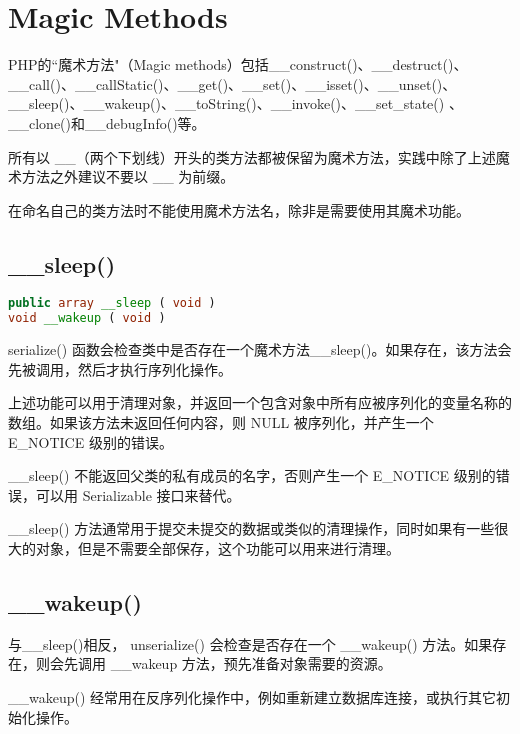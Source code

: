 \chapter{Magic Methods}

PHP的``魔术方法"（Magic methods）包括\_\_construct()、\_\_destruct()、\_\_call()、\_\_callStatic()、\_\_get()、\_\_set()、\_\_isset()、\_\_unset()、\_\_sleep()、\_\_wakeup()、\_\_toString()、\_\_invoke()、\_\_set\_state() 、\_\_clone()和\_\_debugInfo()等。


所有以 \_\_（两个下划线）开头的类方法都被保留为魔术方法，实践中除了上述魔术方法之外建议不要以 \_\_ 为前缀。

在命名自己的类方法时不能使用魔术方法名，除非是需要使用其魔术功能。


\section{\_\_sleep()}


\begin{lstlisting}[language=PHP]
public array __sleep ( void )
void __wakeup ( void )
\end{lstlisting}

serialize() 函数会检查类中是否存在一个魔术方法\_\_sleep()。如果存在，该方法会先被调用，然后才执行序列化操作。

上述功能可以用于清理对象，并返回一个包含对象中所有应被序列化的变量名称的数组。如果该方法未返回任何内容，则 NULL 被序列化，并产生一个 E\_NOTICE 级别的错误。

\_\_sleep() 不能返回父类的私有成员的名字，否则产生一个 E\_NOTICE 级别的错误，可以用 Serializable 接口来替代。

\_\_sleep() 方法通常用于提交未提交的数据或类似的清理操作，同时如果有一些很大的对象，但是不需要全部保存，这个功能可以用来进行清理。


\section{\_\_wakeup()}


与\_\_sleep()相反， unserialize() 会检查是否存在一个 \_\_wakeup() 方法。如果存在，则会先调用 \_\_wakeup 方法，预先准备对象需要的资源。

\_\_wakeup() 经常用在反序列化操作中，例如重新建立数据库连接，或执行其它初始化操作。


